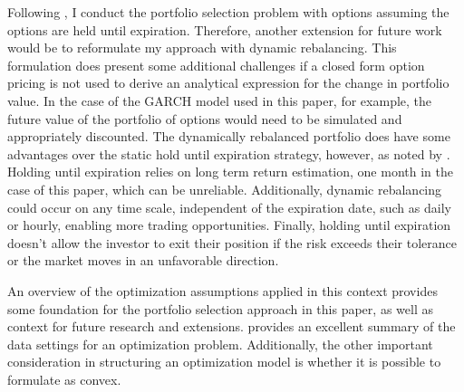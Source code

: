 Following \cite{faias2017optimal}, I conduct the portfolio selection problem with options assuming the options are held until expiration. Therefore, another extension for future work would be to reformulate my approach with dynamic rebalancing. This formulation does present some additional challenges if a closed form option pricing is not used to derive an analytical expression for the change in portfolio value. In the case of the GARCH model used in this paper, for example, the future value of the portfolio of options would need to be simulated and appropriately discounted. The dynamically rebalanced portfolio does have some advantages over the static hold until expiration strategy, however, as noted by \cite{markowitz}. Holding until expiration relies on long term return estimation, one month in the case of this paper, which can be unreliable. Additionally, dynamic rebalancing could occur on any time scale, independent of the expiration date, such as daily or hourly, enabling more trading opportunities. Finally, holding until expiration doesn't allow the investor to exit their position if the risk exceeds their tolerance or the market moves in an unfavorable direction.


An overview of the optimization assumptions applied in this context provides some foundation for the portfolio selection approach in this paper, as well as context for future research and extensions. \cite{hannah2015stochastic} provides an excellent summary of the data settings for an optimization problem. Additionally, the other important consideration in structuring an optimization model is whether it is possible to formulate as convex.

